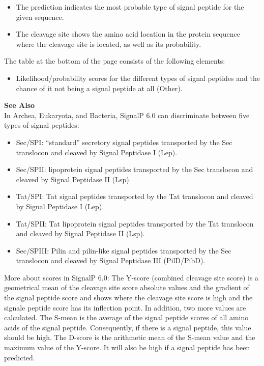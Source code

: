 \begin{itemize}
\item The prediction indicates the most probable type of signal peptide for the given sequence.
\item The cleavage site shows the amino acid location in the protein sequence where the cleavage site is located, as well as its probability.
\end{itemize}

The table at the bottom of the page consists of the following elements:

\begin{itemize}
\item Likelihood/probability scores for the different types of signal peptides and the chance of it not being a signal peptide at all (Other).
\end{itemize}

\begin{framed}
\textbf{See Also}\\
In Archea, Eukaryota, and Bacteria, SignalP 6.0 can discriminate between five types of signal peptides:

\begin{itemize}
\item Sec/SPI: ``standard'' secretory signal peptides transported by the Sec translocon and cleaved by Signal Peptidase I (Lep).
\item Sec/SPII: lipoprotein signal peptides transported by the Sec translocon and cleaved by Signal Peptidase II (Lsp).
\item Tat/SPI: Tat signal peptides transported by the Tat translocon and cleaved by Signal Peptidase I (Lep).
\item Tat/SPII: Tat lipoprotein signal peptides transported by the Tat translocon and cleaved by Signal Peptidase II (Lsp).
\item Sec/SPIII: Pilin and pilin-like signal peptides transported by the Sec translocon and cleaved by Signal Peptidase III (PilD/PibD).
\end{itemize}

More about scores in SignalP 6.0:\newline
The Y-score (combined cleavage site score) is a geometrical mean of the cleavage site score absolute values and the gradient of the signal peptide score and shows where the cleavage site score is high and the signale peptide score has its inflection point.
In addition, two more values are calculated. The S-mean is the average of the signal peptide scores of all amino acids of the signal peptide.
Consequently, if there is a signal peptide, this value should be high.
The D-score is the arithmetic mean of the S-mean value and the maximum value of the Y-score.
It will also be high if a signal peptide has been predicted.
\end{framed}


